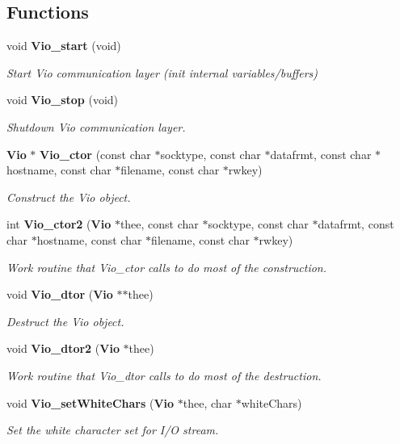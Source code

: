 \subsection*{Functions}
\begin{DoxyCompactItemize}
\item 
void {\bf Vio\+\_\+start} (void)
\begin{DoxyCompactList}\small\item\em Start Vio communication layer (init internal variables/buffers) \end{DoxyCompactList}\item 
void {\bf Vio\+\_\+stop} (void)
\begin{DoxyCompactList}\small\item\em Shutdown Vio communication layer. \end{DoxyCompactList}\item 
{\bf Vio} $\ast$ {\bf Vio\+\_\+ctor} (const char $\ast$socktype, const char $\ast$datafrmt, const char $\ast$hostname, const char $\ast$filename, const char $\ast$rwkey)
\begin{DoxyCompactList}\small\item\em Construct the Vio object. \end{DoxyCompactList}\item 
int {\bf Vio\+\_\+ctor2} ({\bf Vio} $\ast$thee, const char $\ast$socktype, const char $\ast$datafrmt, const char $\ast$hostname, const char $\ast$filename, const char $\ast$rwkey)
\begin{DoxyCompactList}\small\item\em Work routine that Vio\+\_\+ctor calls to do most of the construction. \end{DoxyCompactList}\item 
void {\bf Vio\+\_\+dtor} ({\bf Vio} $\ast$$\ast$thee)
\begin{DoxyCompactList}\small\item\em Destruct the Vio object. \end{DoxyCompactList}\item 
void {\bf Vio\+\_\+dtor2} ({\bf Vio} $\ast$thee)
\begin{DoxyCompactList}\small\item\em Work routine that Vio\+\_\+dtor calls to do most of the destruction. \end{DoxyCompactList}\item 
void {\bf Vio\+\_\+set\+White\+Chars} ({\bf Vio} $\ast$thee, char $\ast$white\+Chars)
\begin{DoxyCompactList}\small\item\em Set the white character set for I/\+O stream. \end{DoxyCompactList}\item 
$$
\end{DoxyCompactItemize}

